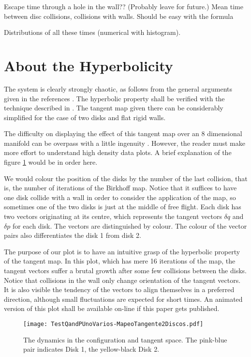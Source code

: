 \documentclass[a4paper,10pt, jcp, aps, preprint]{revtex4-1}
\begin{document}
Escape time through a hole in the wall?? (Probably leave for future.)
Mean time between disc collisions, collisions with walls. Should be easy with the formula

Distributions of all these times (numerical with histogram).



\section{About the Hyperbolicity}

The system is clearly strongly chaotic, as follows from
the general arguments given in the references \cite{Sim99, MarkChern}.
The hyperbolic property shall be verified with the technique described
in \cite{Dellago96}. The tangent map given there can be considerably
simplified for the case of two disks and flat rigid walls.

The difficulty on displaying the effect of this tangent map over
an 8 dimensional manifold
can be overpass with a little ingenuity \cite{Tufte}. However,
the reader must make more effort to understand high density data
plots. A brief explanation of the figure \ref{TangentMap} would
be in order here. 

We would colour the position of the disks by the number of
the last collision, that is, the number of iterations of
the Birkhoff map. Notice that it suffices to have one disk collide
with a wall in order to consider the application of the map, so
sometimes one of the two disks is just at the middle of
free flight. Each disk has two vectors originating at its centre,
which represents the tangent vectors $\delta q$ and 
$\delta p$ for each disk. 
The vectors are distinguished by colour. The colour of the vector pairs
also differentiates the disk 1 from disk 2. 

The purpose of our plot is to have an intuitive grasp of the
hyperbolic property of the tangent map. In this plot, which has mere 16
iterations of the map, the tangent vectors suffer a brutal growth after
some few collisions between the disks. Notice that collisions in
the wall only change orientation of the tangent vectors.
It is also visible the tendency of the vectors to align themselves
in a preferred direction, although small fluctuations are
expected for short times. An animated version of this plot 
shall be available on-line if this paper gets published. 

\begin{figure}
\centering
\texttt{[image: TestQandPUnoVarios-MapeoTangente2Discos.pdf]} 
\caption{The dynamics in the configuration and tangent space. The pink-blue pair
indicates Disk 1, the yellow-black Disk 2.}\label{TangentMap}
\end{figure}




\end{document}
